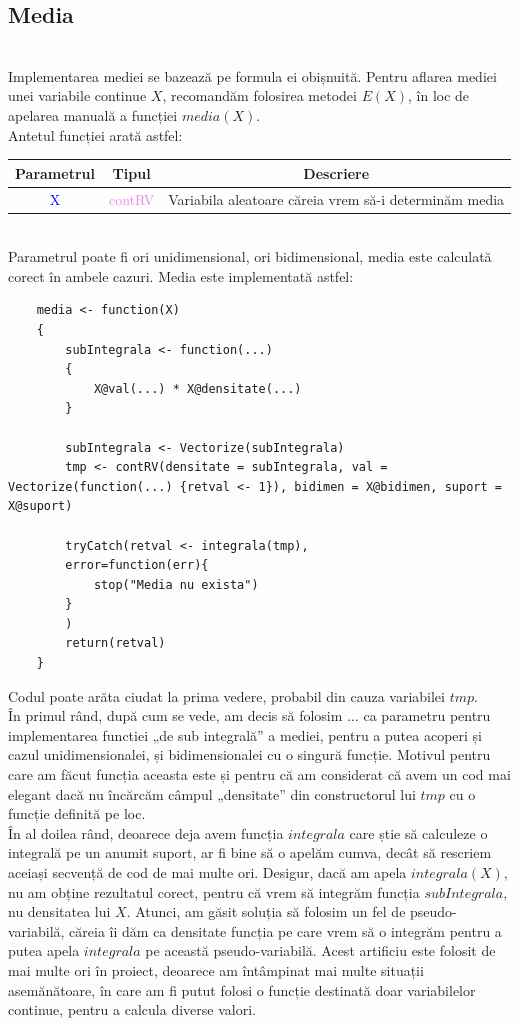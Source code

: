 \documentclass[12pt]{article}
\begin{document}
\subsection{Media} \hfill \\
\indent Implementarea mediei se bazează pe formula ei obișnuită. Pentru aflarea mediei unei variabile continue $X$, recomandăm folosirea metodei $E(X)$, în loc de apelarea manuală a funcției $media(X)$.\\
\indent Antetul funcției arată astfel:
\begin{center}
	\begin{tabular}{|| c | c | c ||}
		\hline
		Parametrul & Tipul & Descriere \\
		\hline
		\textcolor{blue}{X} & \textcolor{violet}{contRV} & Variabila aleatoare căreia vrem să-i determinăm media\\
		\hline
	\end{tabular}
\end{center}\hfill \\
\indent Parametrul poate fi ori unidimensional, ori bidimensional, media este calculată corect în ambele cazuri. Media este implementată astfel: 
\begin{lstlisting}
	media <- function(X)
	{
		subIntegrala <- function(...)
		{
			X@val(...) * X@densitate(...)
		}
		
		subIntegrala <- Vectorize(subIntegrala)
		tmp <- contRV(densitate = subIntegrala, val = Vectorize(function(...) {retval <- 1}), bidimen = X@bidimen, suport = X@suport)
		
		tryCatch(retval <- integrala(tmp),
		error=function(err){
			stop("Media nu exista")
		}
		)
		return(retval)
	}
\end{lstlisting} \pagebreak \par
Codul poate arăta ciudat la prima vedere, probabil din cauza variabilei $tmp$.\\
\indent În primul rând, după cum se vede, am decis să folosim $\dots$ ca parametru pentru implementarea functiei „de sub integrală” a mediei, pentru a putea acoperi și cazul unidimensionalei, și bidimensionalei cu o singură funcție. Motivul pentru care am făcut funcția aceasta este și pentru că am considerat că avem un cod mai elegant dacă nu încărcăm câmpul „densitate” din constructorul lui $tmp$ cu o funcție definită pe loc.\\
\indent În al doilea rând, deoarece deja avem funcția $integrala$ care știe să calculeze o integrală pe un anumit suport, ar fi bine să o apelăm cumva, decât să rescriem aceiași secvență de cod de mai multe ori. Desigur, dacă am apela $integrala(X)$, nu am obține rezultatul corect, pentru că vrem să integrăm funcția $subIntegrala$, nu densitatea lui $X$. Atunci, am găsit soluția să folosim un fel de pseudo-variabilă, căreia îi dăm ca densitate funcția pe care vrem să o integrăm pentru a putea apela $integrala$ pe această pseudo-variabilă. Acest artificiu este folosit de mai multe ori în proiect, deoarece am întâmpinat mai multe situații asemănătoare, în care am fi putut folosi o funcție destinată doar variabilelor continue, pentru a calcula diverse valori.\\
\end{document}
